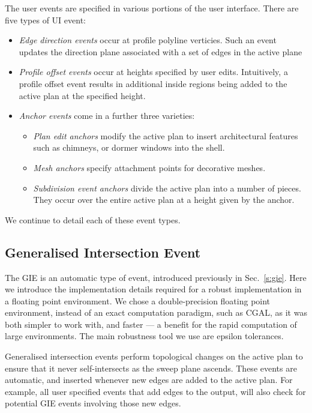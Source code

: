 The user events are specified in various portions of the user interface. There are five types of UI event:
\begin{itemize}
\item{\emph{Edge direction events} occur at profile polyline verticies. Such an event updates the direction plane associated with a set of edges in the active plane}
\item{\emph{Profile offset events} occur at heights specified by user edits. Intuitively, a profile offset event results in additional inside regions being added to the active plan at the specified height. }
\item{\emph{Anchor events} come in a further three varieties:
   \begin{itemize}
        \item {\emph{Plan edit anchors} modify the active plan to insert architectural features such as chimneys, or dormer windows into the shell. }
        \item {\emph{Mesh anchors} specify attachment points for decorative meshes.}
        \item {\emph{Subdivision event anchors} divide the active plan into a number of pieces. They occur over the entire active plan at a height given by the anchor.}
   \end{itemize}
}
\end{itemize}

We continue to detail each of these event types.

\subsection {Generalised Intersection Event}
\label{section:eventImpl}

The GIE is an automatic type of event, introduced previously in Sec.~\ref{s:gie}. Here we introduce the implementation details required for a robust implementation in a floating point environment. We chose a double-precision floating point environment, instead of an exact computation paradigm, such as CGAL\cite{cgal}, as it was both simpler to work with, and faster --- a benefit for the rapid computation of large environments. The main robustness tool we use are epsilon tolerances.

Generalised intersection events perform topological changes on the active plan to ensure that it never self-intersects as the sweep plane ascends. These events are automatic, and inserted whenever new edges are added to the active plan. For example, all user specified events that add edges to the output, will also check for potential GIE events involving those new edges.


